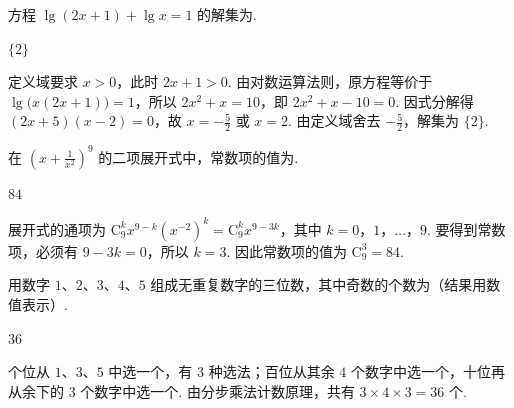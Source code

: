 \begin{problem}
方程 \( \lg(2x+1)+\lg x=1 \) 的解集为\fillinblank{}.

\begin{answer}
\(\{2\}\)
\end{answer}

\begin{solution}
定义域要求 \(x>0\)，此时 \(2x+1>0\). 由对数运算法则，原方程等价于 \(\lg\bigl(x(2x+1)\bigr)=1\)，所以 \(2x^2+x=10\)，即 \(2x^2+x-10=0\). 因式分解得 \((2x+5)(x-2)=0\)，故 \(x=-\frac52\) 或 \(x=2\). 由定义域舍去 \(-\frac52\)，解集为 \(\{2\}\).
\end{solution}
\end{problem}

\begin{problem}
在 \( \left(x+\frac{1}{x^{2}}\right)^{9} \) 的二项展开式中，常数项的值为\fillinblank{}.

\begin{answer}
\(84\)
\end{answer}

\begin{solution}
展开式的通项为 \(\mathrm C_9^k x^{9-k}\left(x^{-2}\right)^k=\mathrm C_9^k x^{9-3k}\)，其中 \(k=0\)，\(1\)，\(\ldots\)，\(9\). 要得到常数项，必须有 \(9-3k=0\)，所以 \(k=3\). 因此常数项的值为 \(\mathrm C_9^3=84\).
\end{solution}
\end{problem}

\begin{problem}
用数字 \(1\)、\(2\)、\(3\)、\(4\)、\(5\) 组成无重复数字的三位数，其中奇数的个数为\fillinblank{}（结果用数值表示）.
\end{problem}

\begin{answer}
\(36\)
\end{answer}

\begin{solution}
个位从 \(1\)、\(3\)、\(5\) 中选一个，有 \(3\) 种选法；百位从其余 \(4\) 个数字中选一个，十位再从余下的 \(3\) 个数字中选一个. 由分步乘法计数原理，共有 \(3\times4\times3=36\) 个.
\end{solution}

